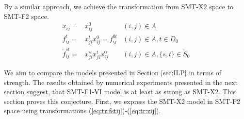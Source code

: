 By a similar approach, we achieve the transformation from SMT-X2 space to SMT-F2 space. 
\begin{subequations}
\begin{align}
\label{eq:tr:fstij2}x_{ij}=&x^0_{ij} & (i,j)\in A\\
\label{eq:tr:fijt2}f^t_{ij}=&x^t_{ji}x^0_{ij}=f^{0t}_{ij} & (i,j)\in A, t\in D_0\\
\label{eq:tr:fstij2}\check{f}^{st}_{ij}=& x^s_{ji}x^t_{ji}x^0_{ij} & (i,j)\in A, \{s,t\}\in \check{S}_0
\end{align}
\end{subequations}

We aim to compare the models presented in Section \ref{sec:ILP} in terms of strength. The results obtained by numerical experiments presented in the next section suggest, that SMT-F1-VI model is at least as strong as SMT-X2. This section proves this conjecture. 
First, we express the SMT-X2 model in SMT-F2 space using transformations (\ref{eq:tr:fstij})-(\ref{eq:tr:zij}). 
